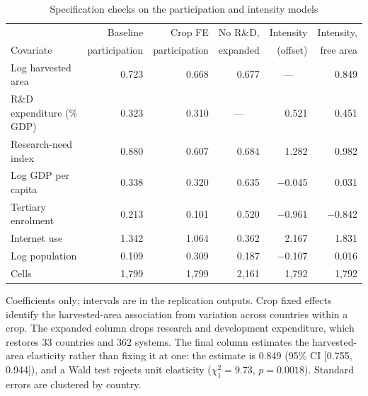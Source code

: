 \begin{table}[!t]
\centering
\footnotesize
\caption{Specification checks on the participation and intensity models}
\label{tab:specchecks}
\begin{tabular*}{\textwidth}{@{\extracolsep\fill}l r r r r r@{}}
\toprule
& Baseline & Crop FE & No R\&D, & Intensity & Intensity, \\
Covariate & participation & participation & expanded & (offset) & free area \\
\midrule
Log harvested area & 0.723 & 0.668 & 0.677 & \multicolumn{1}{c}{---} & 0.849 \\
R\&D expenditure (\% GDP) & 0.323 & 0.310 & \multicolumn{1}{c}{---} & 0.521 & 0.451 \\
Research-need index & 0.880 & 0.607 & 0.684 & 1.282 & 0.982 \\
Log GDP per capita & 0.338 & 0.320 & 0.635 & $-$0.045 & 0.031 \\
Tertiary enrolment & 0.213 & 0.101 & 0.520 & $-$0.961 & $-$0.842 \\
Internet use & 1.342 & 1.064 & 0.362 & 2.167 & 1.831 \\
Log population & 0.109 & 0.309 & 0.187 & $-$0.107 & 0.016 \\
\midrule
Cells & 1,799 & 1,799 & 2,161 & 1,792 & 1,792 \\
\bottomrule
\end{tabular*}
\begin{tablenotes}
\item[] Coefficients only; intervals are in the replication outputs. Crop fixed effects identify the harvested-area association from variation across countries within a crop. The expanded column drops research and development expenditure, which restores 33 countries and 362 systems. The final column estimates the harvested-area elasticity rather than fixing it at one: the estimate is 0.849 (95\% CI [0.755, 0.944]), and a Wald test rejects unit elasticity ($\chi^2_1 = 9.73$, $p = 0.0018$). Standard errors are clustered by country.
\end{tablenotes}
\end{table}
